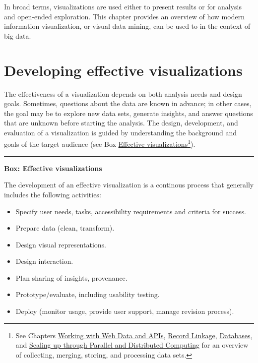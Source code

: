\documentclass[]{krantz}
\begin{document}
In broad terms, visualizations are used either to present results or for
analysis and open-ended exploration. This chapter provides an overview
of how modern information visualization, or visual data mining, can be
used to in the context of big data.

\section{Developing effective visualizations}\label{sec:viz-2}

The effectiveness of a visualization depends on both analysis needs and
design goals. Sometimes, questions about the data are known in advance;
in other cases, the goal may be to explore new data sets, generate
insights, and answer questions that are unknown before starting the
analysis. The design, development, and evaluation of a visualization is
guided by understanding the background and goals of the target audience
(see Box \protect\hyperlink{box:viz1}{Effective
visualizations}\footnote{See Chapters
  \protect\hyperlink{chap:web}{Working with Web Data and APIs},
  \protect\hyperlink{chap:link}{Record Linkage},
  \protect\hyperlink{chap:db}{Databases}, and
  \protect\hyperlink{chap:parallel}{Scaling up through Parallel and
  Distributed Computing} for an overview of collecting, merging,
  storing, and processing data sets.}).

\begin{center}\rule{0.5\linewidth}{\linethickness}\end{center}

\textbf{Box: Effective visualizations}

The development of an effective visualization is a continous process
that generally includes the following activities:

\begin{itemize}
\item
  Specify user needs, tasks, accessibility requirements and criteria for
  success.
\item
  Prepare data (clean, transform).
\item
  Design visual representations.
\item
  Design interaction.
\item
  Plan sharing of insights, provenance.
\item
  Prototype/evaluate, including usability testing.
\item
  Deploy (monitor usage, provide user support, manage revision process).
\end{itemize}
\end{document}
